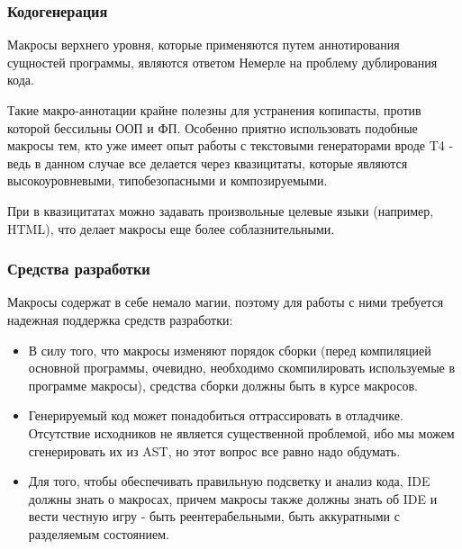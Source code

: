 \documentclass{beamer}
\begin{document}
\begin{frame}[t]
\frametitle{Кодогенерация}

Макросы верхнего уровня, которые применяются путем аннотирования сущностей программы, являются ответом Немерле на проблему дублирования кода.

Такие макро-аннотации крайне полезны для устранения копипасты, против которой бессильны ООП и ФП. Особенно приятно использовать подобные макросы тем, кто уже имеет опыт работы с текстовыми генераторами вроде T4 - ведь в данном случае все делается через квазицитаты, которые являются высокоуровневыми, типобезопасными и композируемыми.

При  в квазицитатах можно задавать произвольные целевые языки (например, HTML), что делает макросы еще более соблазнительными.
\end{frame}

\begin{frame}[t]
\frametitle{Средства разработки}

Макросы содержат в себе немало магии, поэтому для работы с ними требуется надежная поддержка средств разработки:

\begin{itemize}
\item В силу того, что макросы изменяют порядок сборки (перед компиляцией основной программы, очевидно, необходимо скомпилировать используемые в программе макросы), средства сборки должны быть в курсе макросов.
\item Генерируемый код может понадобиться оттрассировать в отладчике. Отсутствие исходников не является существенной проблемой, ибо мы можем сгенерировать их из AST, но этот вопрос все равно надо обдумать.
\item Для того, чтобы обеспечивать правильную подсветку и анализ кода, IDE должны знать о макросах, причем макросы также должны знать об IDE и вести честную игру - быть реентерабельными, быть аккуратными с разделяемым состоянием.
\end{itemize}
\end{frame}
\end{document}
